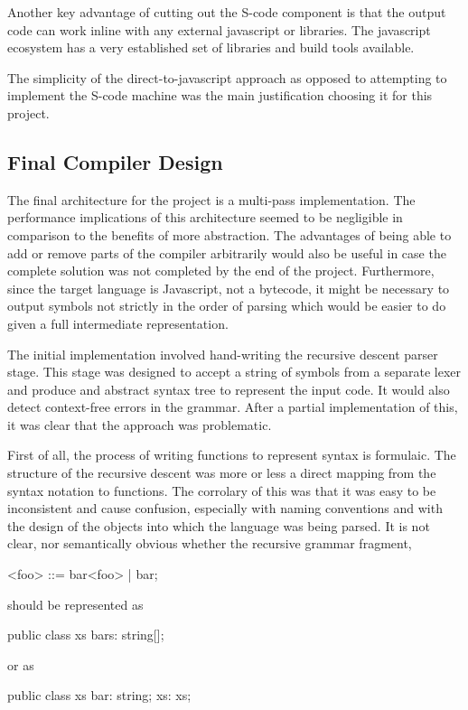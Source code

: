 \documentclass{article}
\begin{document}
Another key advantage of cutting out the S-code component is that the output code can work inline with any external javascript or libraries. The javascript ecosystem has a very established set of libraries and build tools available. 

The simplicity of the direct-to-javascript approach as opposed to attempting to implement the S-code machine was the main justification choosing it for this project.

\subsection{Final Compiler Design}

The final architecture for the project is a multi-pass implementation. The performance implications of this architecture seemed to be negligible in comparison to the benefits of more abstraction. The advantages of being able to add or remove parts of the compiler arbitrarily would also be useful in case the complete solution was not completed by the end of the project. Furthermore, since the target language is Javascript, not a bytecode, it might be necessary to output symbols not strictly in the order of parsing which would be easier to do given a full intermediate representation.

The initial implementation involved hand-writing the recursive descent parser stage. This stage was designed to accept a string of symbols from a separate lexer and produce and abstract syntax tree to represent the input code. It would also detect context-free errors in the grammar. After a partial implementation of this, it was clear that the approach was problematic.

First of all, the process of writing functions to represent syntax is formulaic. The structure of the recursive descent was more or less a direct mapping from the syntax notation to functions. The corrolary of this was that it was easy to be inconsistent and cause confusion, especially with naming conventions and with the design of the objects into which the language was being parsed. It is not clear, nor semantically obvious whether the recursive grammar fragment,

<foo> ::= bar<foo> | bar;

should be represented as

public class xs {
	bars: string[];
}

or as 

public class xs {
	bar: string;
	xs: xs;
}
\end{document}

